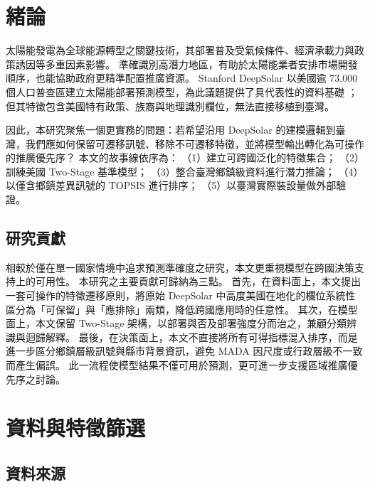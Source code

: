\documentclass[12pt, a4paper]{article}
\begin{document}
\vspace{8pt}

\section{緒論}

太陽能發電為全球能源轉型之關鍵技術，其部署普及受氣候條件、經濟承載力與政策誘因等多重因素影響。
準確識別高潛力地區，有助於太陽能業者安排市場開發順序，也能協助政府更精準配置推廣資源。
Stanford DeepSolar 以美國逾 73,000 個人口普查區建立太陽能部署預測模型，為此議題提供了具代表性的資料基礎 \citep{dubey2021deepsolar}；
但其特徵包含美國特有政策、族裔與地理識別欄位，無法直接移植到臺灣。

因此，本研究聚焦一個更實務的問題：若希望沿用 DeepSolar 的建模邏輯到臺灣，我們應如何保留可遷移訊號、移除不可遷移特徵，並將模型輸出轉化為可操作的推廣優先序？
本文的故事線依序為：
（1）建立可跨國泛化的特徵集合；
（2）訓練美國 Two-Stage 基準模型；
（3）整合臺灣鄉鎮級資料進行潛力推論；
（4）以僅含鄉鎮差異訊號的 TOPSIS 進行排序；
（5）以臺灣實際裝設量做外部驗證。

\subsection{研究貢獻}

相較於僅在單一國家情境中追求預測準確度之研究，本文更重視模型在跨國決策支持上的可用性。
本研究之主要貢獻可歸納為三點。
首先，在資料面上，本文提出一套可操作的特徵遷移原則，將原始 DeepSolar 中高度美國在地化的欄位系統性區分為「可保留」與「應排除」兩類，降低跨國應用時的任意性。
其次，在模型面上，本文保留 Two-Stage 架構，以部署與否及部署強度分而治之，兼顧分類辨識與迴歸解釋。
最後，在決策面上，本文不直接將所有可得指標混入排序，而是進一步區分鄉鎮層級訊號與縣市背景資訊，避免 MADA 因尺度或行政層級不一致而產生偏誤。
此一流程使模型結果不僅可用於預測，更可進一步支援區域推廣優先序之討論。

\section{資料與特徵篩選}

\subsection{資料來源}
\end{document}
